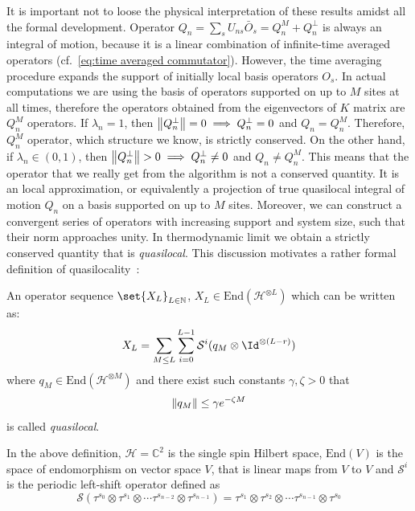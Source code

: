 It is important not to loose the physical interpretation of these results amidst all the formal development.
Operator \(Q_n = \sum_s U_{ns}\bar{O}_{s} = Q_n^M + Q_n^{\perp} \) is always an integral of motion, 
because it is a linear combination of infinite-time averaged operators (cf.~\eqref{eq:time averaged commutator}).
However, the time averaging procedure expands the support of initially local basis operators \(O_s\).
In actual computations we are using the basis of operators supported on up to \(M\) sites at all times, therefore the operators
obtained from the eigenvectors of \(K\) matrix are \(Q_n^M\) operators. If \(\lambda_n = 1\), then
\(\norm{Q_n^{\perp}} = 0 \implies Q_n^{\perp} = 0\) and \(Q_n = Q_n^M\). Therefore, \(Q_n^M\) operator, which
structure we know, is strictly conserved. On the other hand, if \(\lambda_n \in (0,1) \), then
\(\norm{Q_n^{\perp}} > 0 \implies Q_n^{\perp} \neq 0\) and \(Q_n \neq Q_n^M\). This means that the operator
that we really get from the algorithm is not a conserved quantity. It is an local approximation, or equivalently
a projection of true quasilocal integral of motion \(Q_n\) on a basis supported on up to \(M\) sites. Moreover, we can 
construct a convergent series of operators with increasing support and system size, such that their
norm approaches unity. In thermodynamic limit we obtain a strictly conserved
quantity that is \textit{quasilocal}. This discussion motivates a rather formal definition
of quasilocality~\autocite{zadnik2016,Prosen2014c}:
\begin{definition}
  An operator sequence \(\set{X_L}_{L\in \NN}\), \(X_L \in \mathrm{End}(\mathcal{H}^{\otimes L})\) which can be
  written as:
  \begin{equation*}
    X_L = \sum_{M\leq L} \sum_{i=0}^{L-1} \mathcal{S}^i (q_M \otimes \Id^{\otimes(L-r)})
  \end{equation*}
  where \(q_M \in \mathrm{End}(\mathcal{H}^{\otimes M})\) and there exist such constants \(\gamma, \zeta > 0 \) that
  \begin{equation*}
    \norm{q_M} \leq \gamma e^{-\zeta M}
  \end{equation*}
  is called \textit{quasilocal}.
  \label{def:formal quasilocal}
\end{definition}
In the above definition, \(\mathcal{H} = \mathbb{C}^2\) is the single spin Hilbert space,
\(\mathrm{End}(V)\) is the space of endomorphism on vector space \(V\), that is linear maps from \(V\) to \(V\)
and \(\mathcal{S}^i\) is the periodic left-shift operator defined as 
\begin{equation*}
  \mathcal{S}\left(\tau^{s_{0}} \otimes \tau^{s_{1}} \otimes \cdots 
  \tau^{s_{n-2}} \otimes \tau^{s_{n-1}}\right)=\tau^{s_{1}} \otimes
   \tau^{s_{2}} \otimes \cdots \tau^{s_{n-1}} \otimes \tau^{s_{0}}
\end{equation*}
